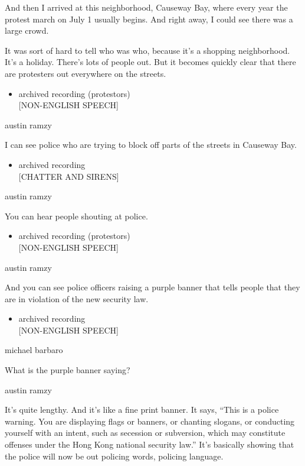 And then I arrived at this neighborhood, Causeway Bay, where every year
the protest march on July 1 usually begins. And right away, I could see
there was a large crowd.

It was sort of hard to tell who was who, because it's a shopping
neighborhood. It's a holiday. There's lots of people out. But it becomes
quickly clear that there are protesters out everywhere on the streets.

\begin{itemize}
\tightlist
\item
  archived recording (protestors)\\
  {[}NON-ENGLISH SPEECH{]}
\end{itemize}

austin ramzy

I can see police who are trying to block off parts of the streets in
Causeway Bay.

\begin{itemize}
\tightlist
\item
  archived recording\\
  {[}CHATTER AND SIRENS{]}
\end{itemize}

austin ramzy

You can hear people shouting at police.

\begin{itemize}
\tightlist
\item
  archived recording (protestors)\\
  {[}NON-ENGLISH SPEECH{]}
\end{itemize}

austin ramzy

And you can see police officers raising a purple banner that tells
people that they are in violation of the new security law.

\begin{itemize}
\tightlist
\item
  archived recording\\
  {[}NON-ENGLISH SPEECH{]}
\end{itemize}

michael barbaro

What is the purple banner saying?

austin ramzy

It's quite lengthy. And it's like a fine print banner. It says, ``This
is a police warning. You are displaying flags or banners, or chanting
slogans, or conducting yourself with an intent, such as secession or
subversion, which may constitute offenses under the Hong Kong national
security law.'' It's basically showing that the police will now be out
policing words, policing language.


